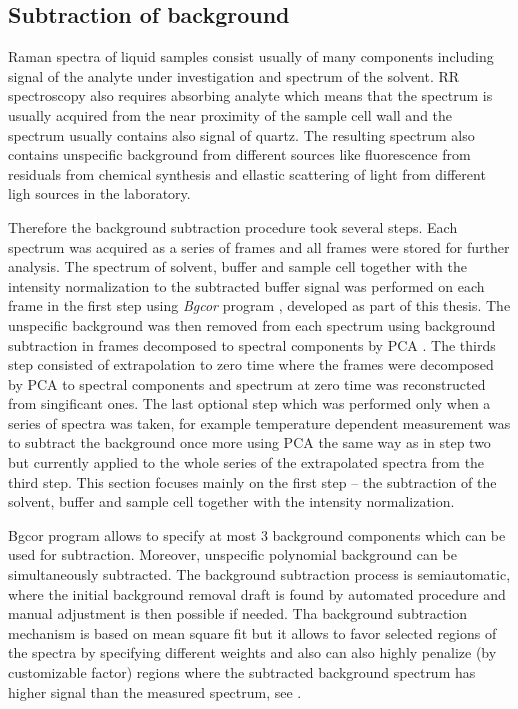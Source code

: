 \subsection{Subtraction of background}
\label{background}

Raman spectra of liquid samples consist usually of many components including
signal of the analyte under investigation and spectrum of the solvent.
RR spectroscopy also requires absorbing analyte which means that the spectrum
is usually acquired from the near proximity of the sample cell wall and the
spectrum usually contains also signal of quartz.
The resulting spectrum also contains unspecific background from different
sources like fluorescence from residuals from chemical synthesis and ellastic
scattering of light from different ligh sources in the laboratory.

Therefore the background subtraction procedure took several steps.
Each spectrum was acquired as a series of frames and all frames were stored
for further analysis.
The spectrum of solvent, buffer and sample cell together with the intensity
normalization to the subtracted buffer signal was performed on each frame in
the first step using \emph{Bgcor} program
\parencite{Bgcor2017},
developed as part of this thesis. The unspecific background was then removed
from each spectrum using background subtraction in frames decomposed to
spectral components by PCA
\parencite{Palacky2011}.
The thirds step consisted of extrapolation to zero time where the frames
were decomposed by PCA to spectral components and spectrum at zero time was
reconstructed from singificant ones.
The last optional step which was performed only when a series of spectra was
taken, for example temperature dependent measurement was to subtract the
background once more using PCA the same way as in step two but currently
applied to the whole series of the extrapolated spectra from the third step.
This section focuses mainly on the first step -- the subtraction of the
solvent, buffer and sample cell together with the intensity normalization.

Bgcor program allows to specify at most 3 background components which can be
used for subtraction. Moreover, unspecific polynomial background can be
simultaneously subtracted.
The background subtraction process is semiautomatic, where the initial
background removal draft is found by automated procedure and manual adjustment
is then possible if needed.
Tha background subtraction mechanism is based on mean square fit but it allows
to favor selected regions of the spectra by specifying different weights and
also can also highly penalize (by customizable factor) regions where the
subtracted background spectrum has higher signal than the measured spectrum,
see
.

